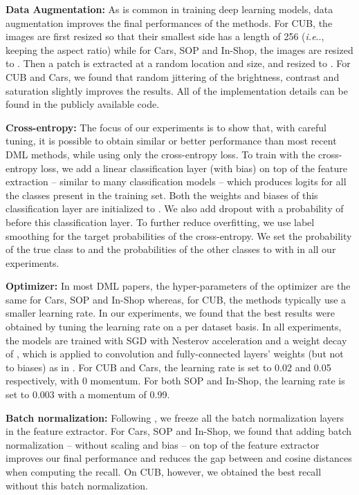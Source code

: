 \documentclass[runningheads]{llncs}
\makeatletter
\DeclareRobustCommand\onedot{\futurelet\@let@token\@onedot}
\def\@onedot{\ifx\@let@token.\else.\null\fi\xspace}
\def\ie{\emph{i.e}\onedot} \def\Ie{\emph{I.e}\onedot}
\makeatother
\begin{document}
\textbf{Data Augmentation:} As is common in training deep learning models, data augmentation improves the final performances of the methods. 
For CUB, the images are first resized so that their smallest side has a length of 256 (\ie, keeping the aspect ratio) while for Cars, SOP and In-Shop, the images are resized to . Then a patch is extracted at a random location and size, and resized to . For CUB and Cars, we found that random jittering of the brightness, contrast and saturation slightly improves the results. All of the implementation details can be found in the publicly available code.





\textbf{Cross-entropy:} The focus of our experiments is to show that, with careful tuning, it is possible to obtain similar or better performance than most recent DML methods, while using only the cross-entropy loss. To train with the cross-entropy loss, we add a linear classification layer (with bias) on top of the feature extraction -- similar to many classification models -- which produces logits for all the classes present in the training set. Both the weights and biases of this classification layer are initialized to . We also add dropout with a probability of  before this classification layer. To further reduce overfitting, we use label smoothing for the target probabilities of the cross-entropy. We set the probability of the true class to  and the probabilities of the other classes to  with  in all our experiments.

\textbf{Optimizer:} In most DML papers, the hyper-parameters of the optimizer are the same for Cars, SOP and In-Shop whereas, for CUB, the methods typically use a smaller learning rate. In our experiments, we found that the best results were obtained by tuning the learning rate on a per dataset basis. In all experiments, the models are trained with SGD with Nesterov acceleration and a weight decay of , which is applied to convolution and fully-connected layers' weights (but not to biases) as in \cite{jia2018highly}. For CUB and Cars, the learning rate is set to 0.02 and 0.05 respectively, with 0 momentum. For both SOP and In-Shop, the learning rate is set to 0.003 with a momentum of 0.99.

\textbf{Batch normalization:} Following \cite{wang2019multi}, we freeze all the batch normalization layers in the feature extractor. For Cars, SOP and In-Shop, we found that adding batch normalization -- without scaling and bias -- on top of the feature extractor improves our final performance and reduces the gap between  and cosine distances when computing the recall. On CUB, however, we obtained the best recall without this batch normalization.
\end{document}
